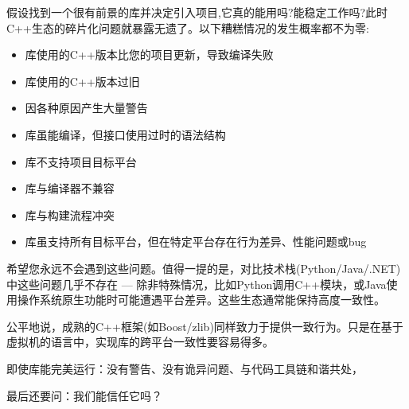 假设找到一个很有前景的库并决定引入项目,它真的能用吗?能稳定工作吗?此时C++生态的碎片化问题就暴露无遗了。以下糟糕情况的发生概率都不为零:

\begin{itemize}
\item 
库使用的C++版本比您的项目更新，导致编译失败

\item 
库使用的C++版本过旧

\item 
因各种原因产生大量警告

\item 
库虽能编译，但接口使用过时的语法结构

\item 
库不支持项目目标平台

\item 
库与编译器不兼容

\item 
库与构建流程冲突

\item 
库虽支持所有目标平台，但在特定平台存在行为差异、性能问题或bug
\end{itemize}

希望您永远不会遇到这些问题。值得一提的是，对比技术栈(Python/Java/.NET)中这些问题几乎不存在 --- 除非特殊情况，比如Python调用C++模块，或Java使用操作系统原生功能时可能遭遇平台差异。这些生态通常能保持高度一致性。

公平地说，成熟的C++框架(如Boost/zlib)同样致力于提供一致行为。只是在基于虚拟机的语言中，实现库的跨平台一致性要容易得多。

即使库能完美运行：没有警告、没有诡异问题、与代码工具链和谐共处，

最后还要问：我们能信任它吗？










